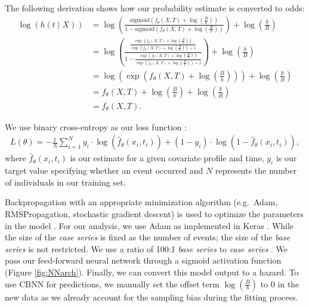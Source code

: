 \documentclass[APA,LATO1COL]{WileyNJD-v2}
\begin{document}
The following derivation shows how our probability estimate is converted
to odds: \begin{align*}
 \log\left( h(t \mid X) \right) &= \log\left(\frac{\mathrm{sigmoid}\left(f_{\theta}(X, T) + \log\left(\frac{B}{b}\right)\right)}{1-\mathrm{sigmoid}\left(f_{\theta}(X, T) + \log\left(\frac{B}{b}\right)\right)}\right) + \log\left(\frac{b}{B}\right) \\
 &= \log\left( \frac{\frac{\exp\left(f_{\theta}(X, T) + \log\left(\frac{B}{b}\right)\right)}{\exp\left(f_{\theta}(X, T) + \log\left(\frac{B}{b}\right)\right)+1}}{1-\frac{\exp\left(f_{\theta}(X, T) + \log\left(\frac{B}{b}\right)\right)}{\exp\left(f_{\theta}(X, T) + \log\left(\frac{B}{b}\right)\right)+1}}\right) + \log\left(\frac{b}{B}\right) \\
 &= \log\left(\exp\left( f_{\theta}(X, T) + \log\left(\frac{B}{b}\right) \right) \right) + \log\left(\frac{b}{B}\right) \\
 &= f_{\theta}(X, T) + \log\left(\frac{B}{b}\right) + \log\left(\frac{b}{B}\right) \\
&= f_{\theta}(X, T). 
\end{align*}

We use binary cross-entropy as our loss function \citep{gulli2017}:
\begin{align*}
L(\theta)=-\frac{1}{N} \sum^{N}_{i=1} y_{i} \cdot \log(\hat{f}_{\theta}(x_{i}, t_{i}) ) + (1-y_{i} )\cdot \log(1-\hat{f}_{\theta}(x_{i}, t_{i}) ),
\end{align*} where \(\hat{f}_{\theta}(x_{i}, t_{i})\) is our estimate
for a given covariate profile and time, \(y_{i}\) is our target value specifying whether an event occurred and \(N\) represents
the number of individuals in our training set.

Backpropagation with an appropriate minimization algorithm (e.g.~Adam, RMSPropagation, stochastic gradient
descent) is used to optimize the parameters in the model \citep{gulli2017}. For our analysis, we use Adam as implemented
in Keras \citep{gulli2017}. While the size of the \emph{case series} is fixed as the number of events; the size of the
\emph{base series} is not restricted. We use a ratio of 100:1 \emph{base series} to \emph{case series} \citep{hanley2009}.
We pass our feed-forward neural network through a sigmoid activation function (Figure \ref{fig:NNarch}). Finally, we can
convert this model output to a hazard. To use CBNN for predictions, we manually set the offset term \(\log\left(\frac{B}{b} \right)\)
to 0 in the new data as we already account for the sampling bias during the fitting process.
\end{document}
